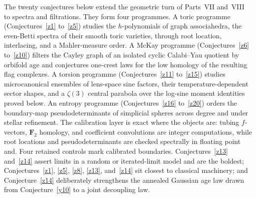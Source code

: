 \documentclass[11pt]{article}
\theoremstyle{definition}
\begin{document}
The twenty conjectures below extend the geometric turn of Parts~VII and~VIII to spectra and filtrations.  They form four programmes.  A toric programme (Conjectures~\ref{z1} to~\ref{z5}) studies the $h$-polynomials of graph associahedra, the even-Betti spectra of their smooth toric varieties, through root location, interlacing, and a Mahler-measure order.  A McKay programme (Conjectures~\ref{z6} to~\ref{z10}) filters the Cayley graph of an isolated cyclic Calabi--Yau quotient by orbifold age and conjectures one-crest laws for the low homology of the resulting flag complexes.  A torsion programme (Conjectures~\ref{z11} to~\ref{z15}) studies microcanonical ensembles of lens-space sine factors, their temperature-dependent sector shapes, and a $\zeta(3)$ central parabola over the log-sine moment identities proved below.  An entropy programme (Conjectures~\ref{z16} to~\ref{z20}) orders the boundary-map pseudodeterminants of simplicial spheres across degree and under stellar refinement.  The calibration layer is exact where the objects are: tubing $f$-vectors, $\mathbf F_2$ homology, and coefficient convolutions are integer computations, while root locations and pseudodeterminants are checked spectrally in floating point and.  Four retained controls mark calibrated boundaries.  Conjectures~\ref{z13} and~\ref{z14} assert limits in a random or iterated-limit model and are the boldest; Conjectures~\ref{z1}, \ref{z5}, \ref{z8}, \ref{z13}, and~\ref{z14} sit closest to classical machinery; and Conjecture~\ref{z14} deliberately strengthens the annealed Gaussian age law drawn from Conjecture~\ref{y10} to a joint decoupling law.
\end{document}
